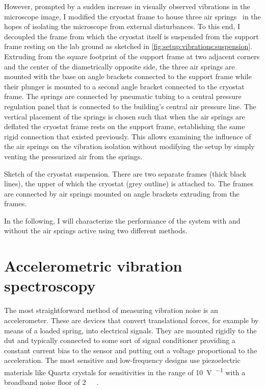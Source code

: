 However, prompted by a sudden increase in visually observed vibrations in the microscope image, I modified the cryostat frame to house three air springs~ in the hopes of isolating the microscope from external disturbances.
To this end, I decoupled the frame from which the cryostat itself is suspended from the support frame resting on the lab ground as sketched in \cref{fig:setup:vibrations:suspension}.
Extruding from the square footprint of the support frame at two adjacent corners and the center of the diametrically opposite side, the three air springs are mounted with the base on angle brackets connected to the support frame while their plunger is mounted to a second angle bracket connected to the cryostat frame.
The springs are connected by pneumatic tubing to a central pressure regulation panel that is connected to the building's central air pressure line.
The vertical placement of the springs is chosen such that when the air springs are deflated the cryostat frame rests on the support frame, establishing the same rigid connection that existed previously.
This allows examining the influence of the air springs on the vibration isolation without modifying the setup by simply venting the pressurized air from the springs.

\begin{marginfigure}[*-7]
    \centering
    
    \caption[]{
        Sketch of the cryostat suspension.
        There are two separate frames (thick black lines), the upper of which the cryostat (grey outline) is attached to.
        The frames are connected by air springs mounted on angle brackets extruding from the frames.
    }
    \label{fig:setup:vibrations:suspension}
\end{marginfigure}

In the following, I will characterize the performance of the system with and without the air springs active using two different methods.

\section{Accelerometric vibration spectroscopy}\label{sec:setup:vibrations:accel}
The most straightforward method of measuring vibration noise is an accelerometer.
These are devices that convert translational forces, for example by means of a loaded spring, into electrical signals.
They are mounted rigidly to the \gls{dut} and typically connected to some sort of signal conditioner providing a constant current bias to the sensor and putting out a voltage proportional to the acceleration.
The most sensitive and low-frequency designs use piezoelectric materials like Quartz crystals for sensitivities in the range of \qty{10}{\volt\per\gaccel} with a broadband noise floor of \qty{2}{\micro\gaccel}~\cite{WilcoxonAccel}.

